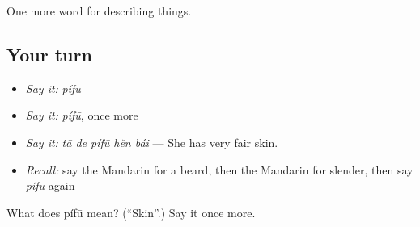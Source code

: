 \begin{grammarlens}[title={What you've built}]
One more word for describing things.
\end{grammarlens}

\subsection*{Your turn}
\begin{itemize}
\raggedright
  \item \emph{Say it:} \emph{pífū}
  \item \emph{Say it:} \emph{pífū}, once more
  \item \emph{Say it:} \emph{tā de pífū hěn bái} — She has very fair skin.
  \item \emph{Recall:} say the Mandarin for a beard, then the Mandarin for slender, then say \emph{pífū} again
\end{itemize}

\begin{tcolorbox}[breakable,colback=teal!4,colframe=teal!35!black,title={Before you move on}]
What does pífū mean? (\textquotedblleft{}Skin\textquotedblright{}.) Say it once more.
\end{tcolorbox}
